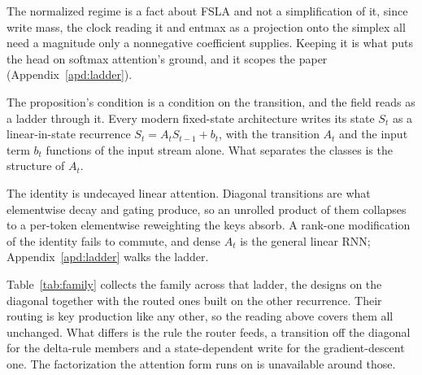 The normalized regime is a fact about FSLA and not a simplification of it, since write mass, the clock reading it and entmax as a projection onto the simplex all need a magnitude only a nonnegative coefficient supplies. Keeping it is what puts the head on softmax attention's ground, and it scopes the paper (Appendix~\ref{apd:ladder}).

The proposition's condition is a condition on the transition, and the field reads as a ladder through it. Every modern fixed-state architecture writes its state $S_t$ as a linear-in-state recurrence $S_t = A_t S_{t-1} + b_t$, with the transition $A_t$ and the input term $b_t$ functions of the input stream alone. What separates the classes is the structure of $A_t$.

The identity is undecayed linear attention. Diagonal transitions are what elementwise decay and gating produce, so an unrolled product of them collapses to a per-token elementwise reweighting the keys absorb. A rank-one modification of the identity fails to commute, and dense $A_t$ is the general linear RNN; Appendix~\ref{apd:ladder} walks the ladder.


Table~\ref{tab:family} collects the family across that ladder, the designs on the diagonal together with the routed ones built on the other recurrence. Their routing is key production like any other, so the reading above covers them all unchanged. What differs is the rule the router feeds, a transition off the diagonal for the delta-rule members and a state-dependent write for the gradient-descent one. The factorization the attention form runs on is unavailable around those.



